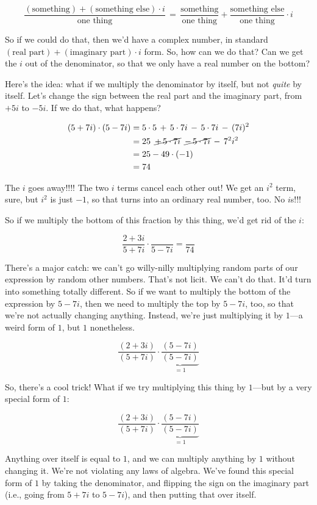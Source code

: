 \documentclass[
]{article}
\begin{document}
\[\frac{(\text{something})+(\text{something else})\cdot i}{\text{one thing}} \,=\, \frac{\text{something}}{\text{one thing}} + \frac{\text{something else}}{\text{one thing}}\cdot i\]

So if we could do that, then we'd have a complex number, in standard
\((\text{real part})+(\text{imaginary part})\cdot i\) form. So, how can
we do that? Can we get the \(i\) out of the denominator, so that we only
have a real number on the bottom?

Here's the idea: what if we multiply the denominator by itself, but not
\emph{quite} by itself. Let's change the sign between the real part and
the imaginary part, from \(+5i\) to \(-5i\). If we do that, what
happens?

\[
\begin{align*}
(5+7i)\cdot(5-7i) &= 5\cdot5 \,+\, 5\cdot7i \,-\, 5\cdot7i \,-\, (7i)^2 \\
&= 25 \,\,\, \cancel{+\, 5\cdot7i} \,\,\, \cancel{-\,5\cdot7i} \,-\, 7^2i^2 \\
&= 25- 49\cdot(-1) \\
&= 74
\end{align*}
\]

The \(i\) goes away!!!! The two \(i\) terms cancel each other out! We
get an \(i^2\) term, sure, but \(i^2\) is just \(-1\), so that turns
into an ordinary real number, too. No \(i\)s!!!

So if we multiply the bottom of this fraction by this thing, we'd get
rid of the \(i\):

\[\frac{2+3i}{5+7i}\cdot \frac{}{5-7i} = \frac{}{74}\]

There's a major catch: we can't go willy-nilly multiplying random parts
of our expression by random other numbers. That's not licit. We can't do
that. It'd turn into something totally different. So if we want to
multiply the bottom of the expression by \(5-7i\), then we need to
multiply the top by \(5-7i\), too, so that we're not actually changing
anything. Instead, we're just multiplying it by \(1\)---a weird form of
\(1\), but \(1\) nonetheless.

\[\frac{(2+3i)}{(5+7i)}\cdot\underbrace{\frac{(5-7i)}{(5-7i)}}_{=1}\]

So, there's a cool trick! What if we try multiplying this thing by
\(1\)---but by a very special form of \(1\):

\[\frac{(2+3i)}{(5+7i)}\cdot\underbrace{\frac{(5-7i)}{(5-7i)}}_{=1}\]

Anything over itself is equal to \(1\), and we can multiply anything by
\(1\) without changing it. We're not violating any laws of algebra.
We've found this special form of \(1\) by taking the denominator, and
flipping the sign on the imaginary part (i.e., going from \(5+7i\) to
\(5-7i\)), and then putting that over itself.
\end{document}
